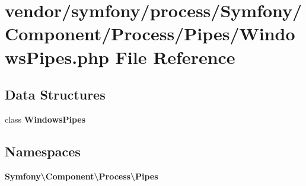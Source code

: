 \section{vendor/symfony/process/\+Symfony/\+Component/\+Process/\+Pipes/\+Windows\+Pipes.php File Reference}
\label{_windows_pipes_8php}
\subsection*{Data Structures}
\begin{DoxyCompactItemize}
\item 
class {\bf Windows\+Pipes}
\end{DoxyCompactItemize}
\subsection*{Namespaces}
\begin{DoxyCompactItemize}
\item 
 {\bf Symfony\textbackslash{}\+Component\textbackslash{}\+Process\textbackslash{}\+Pipes}
\end{DoxyCompactItemize}
